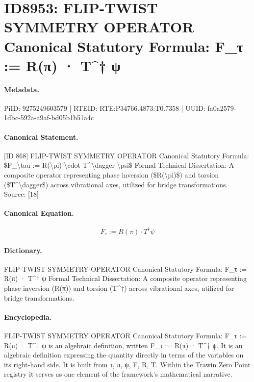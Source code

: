 \section*{ID8953: FLIP-TWIST SYMMETRY OPERATOR Canonical Statutory Formula: F\_τ := R(π) · T\textasciicircum{}† ψ}
\paragraph{Metadata.}
PiID: 9275249603579 | RTEID: RTE:P34766.4873:T0.7358 | UUID: fa0a2579-1dbc-592a-a9af-bd05b1b51a4c

\paragraph{Canonical Statement.}
[ID 868] FLIP-TWIST SYMMETRY OPERATOR Canonical Statutory Formula: \$F\_\textbackslash{}tau := R(\textbackslash{}pi) \textbackslash{}cdot T\textasciicircum{}\textbackslash{}dagger \textbackslash{}psi\$ Formal Technical Dissertation: A composite operator representing phase inversion (\$R(\textbackslash{}pi)\$) and torsion (\$T\textasciicircum{}\textbackslash{}dagger\$) across vibrational axes, utilized for bridge transformations. Source: [18]

\paragraph{Canonical Equation.}
\[
F_\tau := R(\pi) \cdot T^\dagger \psi
\]

\paragraph{Dictionary.}
FLIP-TWIST SYMMETRY OPERATOR Canonical Statutory Formula: F\_τ := R(π) · T\textasciicircum{}† ψ Formal Technical Dissertation: A composite operator representing phase inversion (R(π)) and torsion (T\textasciicircum{}†) across vibrational axes, utilized for bridge transformations.

\paragraph{Encyclopedia.}
FLIP-TWIST SYMMETRY OPERATOR Canonical Statutory Formula: F\_τ := R(π) · T\textasciicircum{}† ψ is an algebraic definition, written F\_τ := R(π) · T\textasciicircum{}† ψ. It is an algebraic definition expressing the quantity directly in terms of the variables on its right-hand side. It is built from τ, π, ψ, F, R, T. Within the Trawin Zero Point registry it serves as one element of the framework's mathematical narrative.
